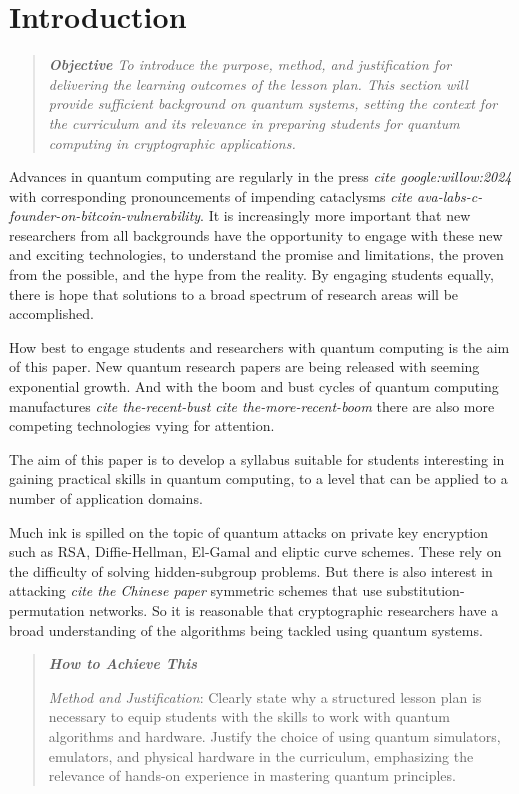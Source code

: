 \section{Introduction}


\begin{quote}\itshape
	\textbf{\emph{Objective}}
	To introduce the purpose, method, and justification for delivering the learning outcomes of the lesson plan. This section will provide sufficient background on quantum systems, setting the context for the curriculum and its relevance in preparing students for quantum computing in cryptographic applications.
\end{quote}\ignorespacesafterend

Advances in quantum computing are regularly in the press \emph{cite google:willow:2024} with corresponding pronouncements
of impending cataclysms \emph{cite ava-labs-c-founder-on-bitcoin-vulnerability}.  It is increasingly more important that new
researchers from all backgrounds have the opportunity to engage with these new and exciting technologies, to understand the
promise and limitations, the proven from the possible, and the hype from the reality.  By engaging students equally, there
is hope that solutions to a broad spectrum of research areas will be accomplished.

How best to engage students and researchers with quantum computing is the aim of this paper.  New quantum research papers are
being released with seeming exponential growth.  And with the boom and bust cycles of quantum computing manufactures \emph{cite the-recent-bust}
\emph{cite the-more-recent-boom} there are also more competing technologies vying for attention.

The aim of this paper is to develop a syllabus suitable for students interesting in gaining practical skills in quantum computing, 
to a level that can be applied to a number of application domains.

Much ink is spilled on the topic of quantum attacks on private key encryption such as RSA, Diffie-Hellman, El-Gamal and eliptic curve schemes.
These rely on the difficulty of solving hidden-subgroup problems.  But there is also interest in attacking \emph{cite the Chinese paper} 
symmetric schemes that use substitution-permutation networks.  So it is reasonable that cryptographic researchers have a broad understanding 
of the algorithms being tackled using quantum systems.

\begin{quote}\itshape
\textbf{\emph{How to Achieve This}}

\emph{Method and Justification}: Clearly state why a structured lesson plan is necessary to equip students with the skills to work with quantum algorithms and hardware. Justify the choice of using quantum simulators, emulators, and physical hardware in the curriculum, emphasizing the relevance of hands-on experience in mastering quantum principles.
\end{quote}\ignorespacesafterend

